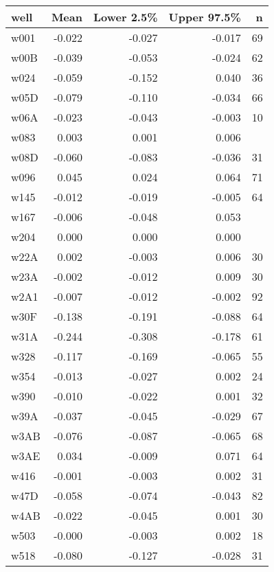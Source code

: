 \begin{table}[ht]
\centering
\begingroup\fontsize{8pt}{2pt}\selectfont
\begin{tabular}{lrrrr}
  \hline
well & Mean & Lower 2.5\% & Upper 97.5\% & n \\ 
  \hline
w001 & -0.022 & -0.027 & -0.017 &   69 \\ 
  w00B & -0.039 & -0.053 & -0.024 &   62 \\ 
  w024 & -0.059 & -0.152 & 0.040 &   36 \\ 
  w05D & -0.079 & -0.110 & -0.034 &   66 \\ 
  w06A & -0.023 & -0.043 & -0.003 &   10 \\ 
  w083 & 0.003 & 0.001 & 0.006 &  \\ 
  w08D & -0.060 & -0.083 & -0.036 &   31 \\ 
  w096 & 0.045 & 0.024 & 0.064 &   71 \\ 
  w145 & -0.012 & -0.019 & -0.005 &   64 \\ 
  w167 & -0.006 & -0.048 & 0.053 &  \\ 
  w204 & 0.000 & 0.000 & 0.000 &  \\ 
  w22A & 0.002 & -0.003 & 0.006 &   30 \\ 
  w23A & -0.002 & -0.012 & 0.009 &   30 \\ 
  w2A1 & -0.007 & -0.012 & -0.002 &   92 \\ 
  w30F & -0.138 & -0.191 & -0.088 &   64 \\ 
  w31A & -0.244 & -0.308 & -0.178 &   61 \\ 
  w328 & -0.117 & -0.169 & -0.065 &   55 \\ 
  w354 & -0.013 & -0.027 & 0.002 &   24 \\ 
  w390 & -0.010 & -0.022 & 0.001 &   32 \\ 
  w39A & -0.037 & -0.045 & -0.029 &   67 \\ 
  w3AB & -0.076 & -0.087 & -0.065 &   68 \\ 
  w3AE & 0.034 & -0.009 & 0.071 &   64 \\ 
  w416 & -0.001 & -0.003 & 0.002 &   31 \\ 
  w47D & -0.058 & -0.074 & -0.043 &   82 \\ 
  w4AB & -0.022 & -0.045 & 0.001 &   30 \\ 
  w503 & -0.000 & -0.003 & 0.002 &   18 \\ 
  w518 & -0.080 & -0.127 & -0.028 &   31 \\ 

\end{tabular}
\end{table}
